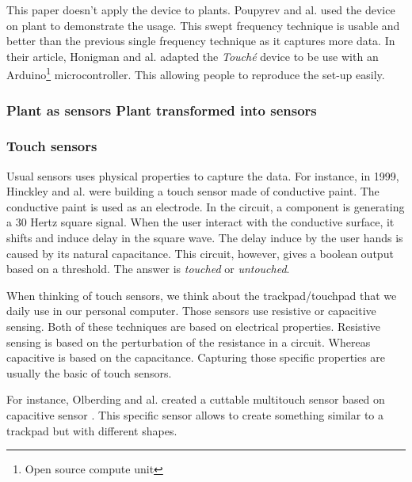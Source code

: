This paper doesn't apply the device to plants. Poupyrev and al. \cite{poupyrevBotanicusInteracticusInteractive2012}
used the device on plant to demonstrate the usage. This swept frequency technique is usable and better
than the previous single frequency technique as it captures more data.
In their article, Honigman and al. \cite{honigmanTechniquesSweptFrequencyb} adapted the \textit{Touché}
device to be use with an Arduino\footnote{Open source compute unit} microcontroller. This allowing people
to reproduce the set-up easily.


\subsubsection{Plant as sensors Plant transformed into sensors}

\subsubsection{Touch sensors}

Usual sensors uses physical properties to capture the data. For instance, in 1999, Hinckley and al. \cite{hinckleyTouchsensingInputDevices1999} 
were building a touch sensor made of conductive paint. The conductive paint is used as an electrode.
In the circuit, a component is generating a 30 Hertz square signal. When the user interact with the conductive surface,
it shifts and induce delay in the square wave. The delay induce by the user hands is caused by its natural
capacitance. This circuit, however, gives a boolean output based on a threshold. The answer is \textit{touched}
or \textit{untouched}. %

When thinking of touch sensors, we think about the trackpad/touchpad that we daily use in our personal 
computer. Those sensors use resistive or capacitive sensing. Both of these techniques are based on electrical
properties. Resistive sensing is based on the perturbation of the resistance in a circuit. Whereas 
capacitive is based on the capacitance. Capturing those specific properties are usually the basic of 
touch sensors.

For instance, Olberding and al. created a cuttable multitouch sensor based on capacitive sensor \cite{olberdingCuttableMultitouchSensor2013}.
This specific sensor allows to create something similar to a trackpad but with different shapes.

